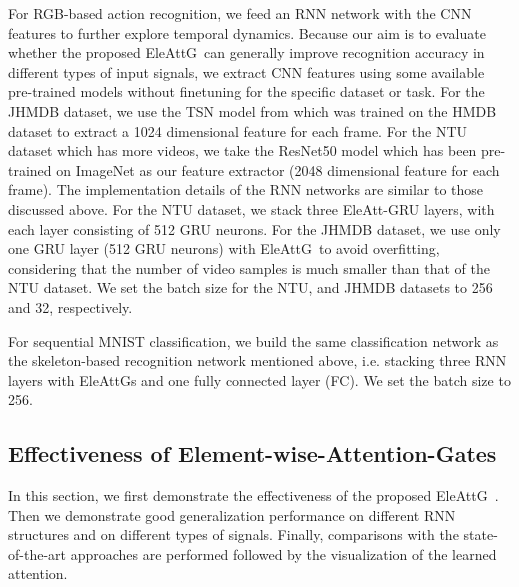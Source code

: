 \documentclass[journal]{IEEEtran}
\newcommand{\Outer}{Element-wise}
\newcommand{\EleAttGn}{{EleAttG}}
\newcommand{\EleAttG}{{EleAttG~}}
\begin{document}
For RGB-based action recognition, we feed an RNN network with the CNN features to further explore temporal dynamics. Because our aim is to evaluate whether the proposed \EleAttG can generally improve recognition accuracy in different types of input signals, we extract CNN features using some available pre-trained models without finetuning for the specific dataset or task. For the JHMDB dataset, we use the TSN model from \cite{wang2016temporal,TSNModel} which was trained on the HMDB dataset \cite{kuehne2011hmdb} to extract a 1024 dimensional feature for each frame. For the NTU dataset which has more videos, we take the ResNet50 model \cite{he2016deep,ResNet50Model} which has been pre-trained on ImageNet as our feature extractor (2048 dimensional feature for each frame). The implementation details of the RNN networks are similar to those discussed above. For the NTU dataset, we stack three EleAtt-GRU layers, with each layer consisting of 512 GRU neurons. For the JHMDB dataset, we use only one GRU layer (512 GRU neurons) with \EleAttG to avoid overfitting, considering that the number of video samples is much smaller than that of the NTU dataset. We set the batch size for the NTU, and JHMDB datasets to 256 and 32, respectively.

For sequential MNIST classification, we build the same classification network as the skeleton-based recognition network mentioned above, i.e. stacking three RNN layers with {\EleAttGn}s and one fully connected layer (FC). We set the batch size to 256.


\subsection{Effectiveness of \Outer-Attention-Gates}

In this section, we first demonstrate the effectiveness of the proposed \EleAttG. Then we demonstrate good generalization performance on different RNN structures and on different types of signals. Finally, comparisons with the state-of-the-art approaches are performed followed by the visualization of the learned attention.
\end{document}
